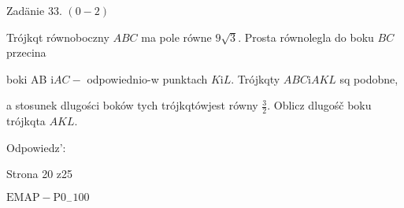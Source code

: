 \documentclass[a4paper,12pt]{article}
\begin{document}
Zadänie 33. $(0-2)$

Trójkqt równoboczny $ABC$ ma pole równe $9\sqrt{3}$. Prosta równolegla do boku $BC$ przecina

boki AB $\mathrm{i} AC -$ odpowiednio-w punktach $K \mathrm{i} L$. Trójkqty $ABC \mathrm{i} AKL$ sq podobne,

a stosunek dlugości boków tych trójkqtówjest równy $\displaystyle \frac{3}{2}$. Oblicz dlugośč boku trójkqta $AKL.$

Odpowiedz':

Strona 20 z25

$\mathrm{E}\mathrm{M}\mathrm{A}\mathrm{P}-\mathrm{P}0_{-}100$
\end{document}
